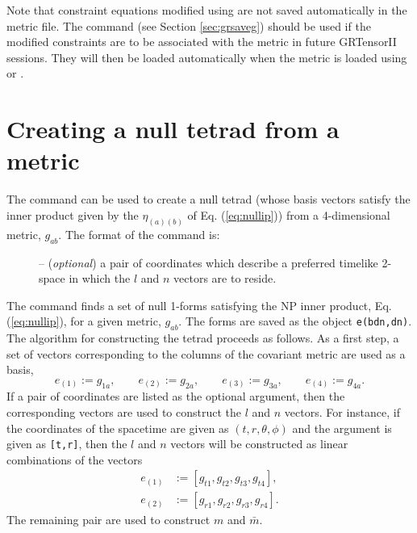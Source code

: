\documentclass{article}
\begin{document}
Note that constraint equations modified using  are
not saved automatically in the metric file. The command 
(see Section \ref{sec:grsaveg})
should be used if the modified constraints are to be associated with the
metric in future GRTensorII sessions. They will then be loaded automatically
when the metric is loaded using  or .
%
\section{Creating a null tetrad from a metric}\label{sec:nptetrad}
%
The command  can be used to create a null tetrad
(whose basis vectors satisfy the inner product given by the
$\eta_{(a)(b)}$ of Eq. (\ref{eq:nullip})) from a 4-dimensional
metric, $g_{ab}$.  The format of the command is:\\
%
\begin{cmdspec}
  \label{spec:nptetrad}

  \begin{description}
    \item[] -- (\textit{optional}) a pair of coordinates
      which describe a preferred timelike 2-space in which the $l$ and $n$
      vectors are to reside.
  \end{description}

\end{cmdspec}

The command finds a set of null 1-forms satisfying the NP inner
product, Eq. (\ref{eq:nullip}), for a given metric, $g_{ab}$.
The forms are saved as the object \texttt{e(bdn,dn)}.\\

The algorithm for constructing the tetrad proceeds as follows. As a first
step, a set of vectors corresponding to the columns of the covariant
metric are used as a basis,
\[
  e_{(1)} := g_{1a}, \qquad e_{(2)} := g_{2a}, \qquad  e_{(3)} := g_{3a},
  \qquad e_{(4)} := g_{4a}.
\]
If a pair of coordinates are listed as the optional 
argument, then the corresponding vectors are used to construct the $l$
and $n$ vectors. For instance, if the coordinates of the spacetime are
given as $(t,r,\theta,\phi)$ and the argument is given as
\texttt{[t,r]}, then the $l$ and $n$ vectors will be constructed as
linear combinations of the vectors
\begin{align*}
  e_{(1)} & := [g_{t1}, g_{t2}, g_{t3}, g_{t4} ], \\
  e_{(2)} & := [g_{r1}, g_{r2}, g_{r3}, g_{r4} ].
\end{align*}
The remaining pair are used to construct $m$ and $\bar{m}$. 
\end{document}
